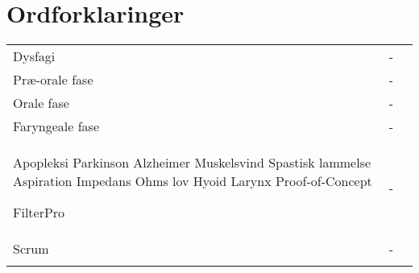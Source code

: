
\chapter{Ordforklaringer}

\begin{table}[H]
\center
{}
\begin{tabularx}{\linewidth}{l l X}	
Dysfagi			& - &   \\ \addlinespace[2mm]
Præ-orale fase	& - &   \\ \addlinespace[2mm]
Orale fase		& - &   \\ \addlinespace[2mm]
Faryngeale fase	& - &   \\ \addlinespace[2mm]
Apopleksi
Parkinson
Alzheimer
Muskelsvind
Spastisk lammelse
Aspiration
Impedans
Ohms lov
Hyoid
Larynx
Proof-of-Concept

FilterPro  		& - &   \\ \addlinespace[2mm]
Scrum 			& - &   \\ \addlinespace[2mm]

\end{tabularx}
\end{table}


